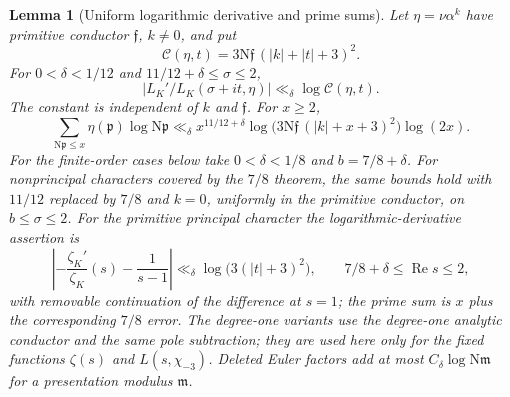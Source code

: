 \documentclass[11pt,a4paper]{article}
\numberwithin{equation}{section}
\newtheorem{lemma}[theorem]{Lemma}
\theoremstyle{definition}
\theoremstyle{remark}
\newcommand{\N}{\mathrm N}
\newcommand{\Rea}{\operatorname{Re}}
\begin{document}
\begin{lemma}[Uniform logarithmic derivative and prime sums]\label{lem:uniform}
Let $\eta=\nu\alpha^k$ have primitive conductor $\mathfrak f$, $k\ne0$, and put
\[
 \mathcal C(\eta,t)=3\N\mathfrak f\,(|k|+|t|+3)^2.
\]
For $0<\delta<1/12$ and $11/12+\delta\le\sigma\le2$,
\begin{equation}\label{eq:logderivative}
 |L_K'/L_K(\sigma+it,\eta)|\ll_\delta\log\mathcal C(\eta,t).
\end{equation}
The constant is independent of $k$ and $\mathfrak f$. For $x\ge2$,
\begin{equation}\label{eq:primeuniform}
 \sum_{\N\mathfrak p\le x}\eta(\mathfrak p)\log\N\mathfrak p
 \ll_\delta x^{11/12+\delta}
 \log\bigl(3\N\mathfrak f\,(|k|+x+3)^2\bigr)\log(2x).
\end{equation}
For the finite-order cases below take $0<\delta<1/8$ and $b=7/8+\delta$. For nonprincipal characters covered by the $7/8$ theorem, the same bounds hold with $11/12$ replaced by $7/8$ and $k=0$, uniformly in the primitive conductor, on $b\le\sigma\le2$. For the primitive principal character the logarithmic-derivative assertion is
\begin{equation}\label{eq:principalderivative}
 \left|-\frac{\zeta_K'}{\zeta_K}(s)-\frac1{s-1}\right|
 \ll_\delta\log\bigl(3(|t|+3)^2\bigr),
 \qquad 7/8+\delta\le\Rea s\le2,
\end{equation}
with removable continuation of the difference at $s=1$; the prime sum is $x$ plus the corresponding $7/8$ error. The degree-one variants use the degree-one analytic conductor and the same pole subtraction; they are used here only for the fixed functions $\zeta(s)$ and $L(s,\chi_{-3})$. Deleted Euler factors add at most $C_\delta\log\N\mathfrak m$ for a presentation modulus $\mathfrak m$.
\end{lemma}
\end{document}
